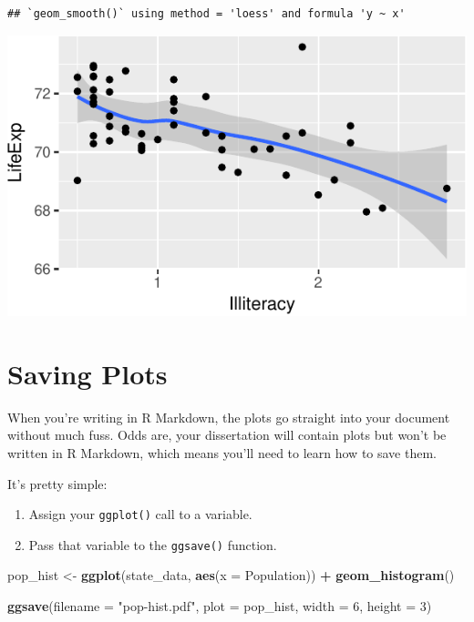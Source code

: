 \documentclass[12pt,oneside,openany]{book}
\newenvironment{Shaded}{\begin{snugshade}}{\end{snugshade}}
\newcommand{\KeywordTok}[1]{\textcolor[rgb]{0.13,0.29,0.53}{\textbf{#1}}}
\newcommand{\DataTypeTok}[1]{\textcolor[rgb]{0.13,0.29,0.53}{#1}}
\newcommand{\DecValTok}[1]{\textcolor[rgb]{0.00,0.00,0.81}{#1}}
\newcommand{\StringTok}[1]{\textcolor[rgb]{0.31,0.60,0.02}{#1}}
\newcommand{\OperatorTok}[1]{\textcolor[rgb]{0.81,0.36,0.00}{\textbf{#1}}}
\newcommand{\NormalTok}[1]{#1}
\providecommand{\tightlist}{%
  \setlength{\itemsep}{0pt}\setlength{\parskip}{0pt}}
\begin{document}
\begin{verbatim}
## `geom_smooth()` using method = 'loess' and formula 'y ~ x'
\end{verbatim}

\includegraphics{pdaps_files/figure-latex/combine-1.pdf}

\section{Saving Plots}\label{saving-plots}

When you're writing in R Markdown, the plots go straight into your
document without much fuss. Odds are, your dissertation will contain
plots but won't be written in R Markdown, which means you'll need to
learn how to save them.

It's pretty simple:

\begin{enumerate}
\def\labelenumi{\arabic{enumi}.}
\tightlist
\item
  Assign your \texttt{ggplot()} call to a variable.
\item
  Pass that variable to the \texttt{ggsave()} function.
\end{enumerate}

\begin{Shaded}
\begin{Highlighting}[]
\NormalTok{pop_hist <-}\StringTok{ }\KeywordTok{ggplot}\NormalTok{(state_data, }\KeywordTok{aes}\NormalTok{(}\DataTypeTok{x =}\NormalTok{ Population)) }\OperatorTok{+}
\StringTok{  }\KeywordTok{geom_histogram}\NormalTok{()}

\KeywordTok{ggsave}\NormalTok{(}\DataTypeTok{filename =} \StringTok{"pop-hist.pdf"}\NormalTok{,}
       \DataTypeTok{plot =}\NormalTok{ pop_hist,}
       \DataTypeTok{width =} \DecValTok{6}\NormalTok{,}
       \DataTypeTok{height =} \DecValTok{3}\NormalTok{)}
\end{Highlighting}
\end{Shaded}
\end{document}
